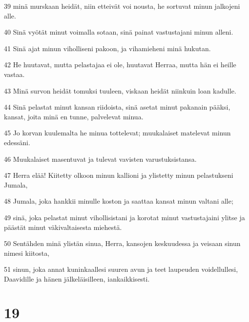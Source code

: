 \par 39 minä murskaan heidät, niin etteivät voi nousta, he sortuvat minun jalkojeni alle.
\par 40 Sinä vyötät minut voimalla sotaan, sinä painat vastustajani minun alleni.
\par 41 Sinä ajat minun viholliseni pakoon, ja vihamieheni minä hukutan.
\par 42 He huutavat, mutta pelastajaa ei ole, huutavat Herraa, mutta hän ei heille vastaa.
\par 43 Minä survon heidät tomuksi tuuleen, viskaan heidät niinkuin loan kadulle.
\par 44 Sinä pelastat minut kansan riidoista, sinä asetat minut pakanain pääksi, kansat, joita minä en tunne, palvelevat minua.
\par 45 Jo korvan kuulemalta he minua tottelevat; muukalaiset matelevat minun edessäni.
\par 46 Muukalaiset masentuvat ja tulevat vavisten varustuksistansa.
\par 47 Herra elää! Kiitetty olkoon minun kallioni ja ylistetty minun pelastukseni Jumala,
\par 48 Jumala, joka hankkii minulle koston ja saattaa kansat minun valtani alle;
\par 49 sinä, joka pelastat minut vihollisistani ja korotat minut vastustajaini ylitse ja päästät minut väkivaltaisesta miehestä.
\par 50 Sentähden minä ylistän sinua, Herra, kansojen keskuudessa ja veisaan sinun nimesi kiitosta,
\par 51 sinun, joka annat kuninkaallesi suuren avun ja teet laupeuden voidellullesi, Daavidille ja hänen jälkeläisilleen, iankaikkisesti.

\chapter{19}

